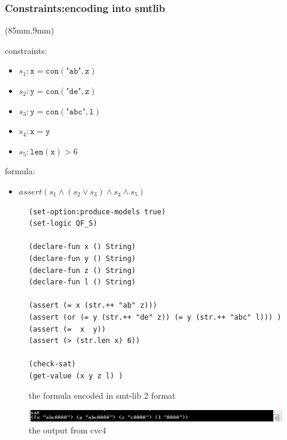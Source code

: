 \begin{frame}[fragile]
  \frametitle{Constraints:encoding into smtlib} 

\begin{textblock*}{40mm}(85mm,9mm)
\tiny
\begin{exampleblock}{}
  constraints:
  	\begin{itemize}
  	\setlength\itemsep{0.1em}
  	    \item $s_1: \texttt{x} =  \texttt{con}(\texttt{"ab"}, \texttt{z}) $   
        \item $s_2: \texttt{y} =  \texttt{con}(\texttt{"de"}, \texttt{z}) $   
        \item $s_3: \texttt{y} =  \texttt{con}(\texttt{"abc"}, \texttt{l})$   
        \item $s_4: \texttt{x} =  \texttt{y}$   
   	    \item $s_5: \texttt{len} (\texttt{x}) > 6$
  	\end{itemize}
  	formula:
		\begin{itemize}
  		   \item $ assert (s_1 \wedge (s_2 \vee s_3 ) \wedge s_4 \wedge s_5)$
  		\end{itemize}
\end{exampleblock}
\end{textblock*}


\begin{figure}[width=5cm]
\scriptsize
\begin{lstlisting}
(set-option:produce-models true)
(set-logic QF_S)
 
(declare-fun x () String)
(declare-fun y () String)
(declare-fun z () String)
(declare-fun l () String)
 
(assert (= x (str.++ "ab" z)))
(assert (or (= y (str.++ "de" z)) (= y (str.++ "abc" l))) )
(assert (=  x  y)) 
(assert (> (str.len x) 6)) 
 
(check-sat)
(get-value (x y z l) )	
\end{lstlisting}

\caption{ \scriptsize the formula encoded in smt-lib 2 format}
\end{figure}\pause

\begin{figure}[h]
\includegraphics[width=12cm]{cvc_output.png}
\caption{ \scriptsize the output from cvc4}
\end{figure}
\end{frame}